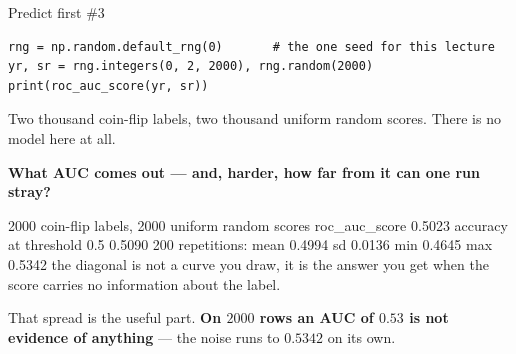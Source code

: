 \documentclass[aspectratio=169]{beamer}
\begin{document}
\begin{frame}[fragile,shrink=6]{Predict first \#3}
\begin{lstlisting}
rng = np.random.default_rng(0)       # the one seed for this lecture
yr, sr = rng.integers(0, 2, 2000), rng.random(2000)
print(roc_auc_score(yr, sr))
\end{lstlisting}
Two thousand coin-flip labels, two thousand uniform random scores. There is no
model here at all.
\begin{center}
  \textbf{What AUC comes out --- and, harder, how far from it can one run
  stray?}
\end{center}
\begin{outblk}
2000 coin-flip labels, 2000 uniform random scores
  roc_auc_score  0.5023
  accuracy at threshold 0.5  0.5090
  200 repetitions: mean 0.4994  sd 0.0136  min 0.4645  max 0.5342
  the diagonal is not a curve you draw, it is the answer you get
  when the score carries no information about the label.
\end{outblk}
\begin{center}\small
  That spread is the useful part. \textbf{On $2000$ rows an AUC of $0.53$ is
  not evidence of anything} --- the noise runs to $0.5342$ on its own.
\end{center}
\end{frame}
\end{document}
